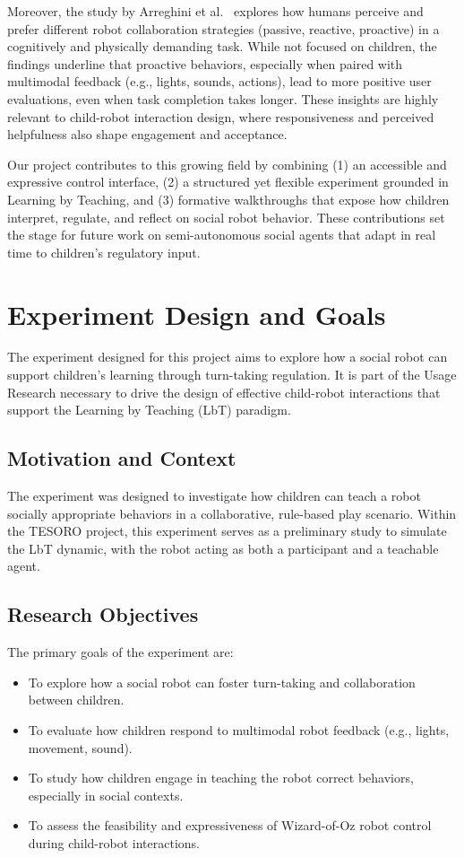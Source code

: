 \documentclass[a4paper]{usiinfbachelorproject}
\begin{document}
Moreover, the study by Arreghini et al.~\cite{arreghini2022exploring} explores how humans perceive and prefer different robot collaboration strategies (passive, reactive, proactive) in a cognitively and physically demanding task.
While not focused on children, the findings underline that proactive behaviors, especially when paired with multimodal feedback (e.g., lights, sounds, actions), lead to more positive user evaluations, even when task completion takes longer.
These insights are highly relevant to child-robot interaction design, where responsiveness and perceived helpfulness also shape engagement and acceptance.

Our project contributes to this growing field by combining (1) an accessible and expressive control interface, (2) a structured yet flexible experiment grounded in Learning by Teaching, and (3) formative walkthroughs that expose how children interpret, regulate, and reflect on social robot behavior.
These contributions set the stage for future work on semi-autonomous social agents that adapt in real time to children's regulatory input.

\section{\textbf{Experiment Design and Goals}}\label{sec:design}

The experiment designed for this project aims to explore how a social robot can support children's learning through turn-taking regulation.
It is part of the Usage Research necessary to drive the design of effective child-robot interactions that support the Learning by Teaching (LbT) paradigm.

\subsection*{\textbf{Motivation and Context}}
The experiment was designed to investigate how children can teach a robot socially appropriate behaviors in a collaborative, rule-based play scenario.
Within the TESORO project, this experiment serves as a preliminary study to simulate the LbT dynamic, with the robot acting as both a participant and a teachable agent.

\subsection*{\textbf{Research Objectives}}
The primary goals of the experiment are:
\begin{itemize}
    \item To explore how a social robot can foster turn-taking and collaboration between children.
    \item To evaluate how children respond to multimodal robot feedback (e.g., lights, movement, sound).
    \item To study how children engage in teaching the robot correct behaviors, especially in social contexts.
    \item To assess the feasibility and expressiveness of Wizard-of-Oz robot control during child-robot interactions.
\end{itemize}
\end{document}
